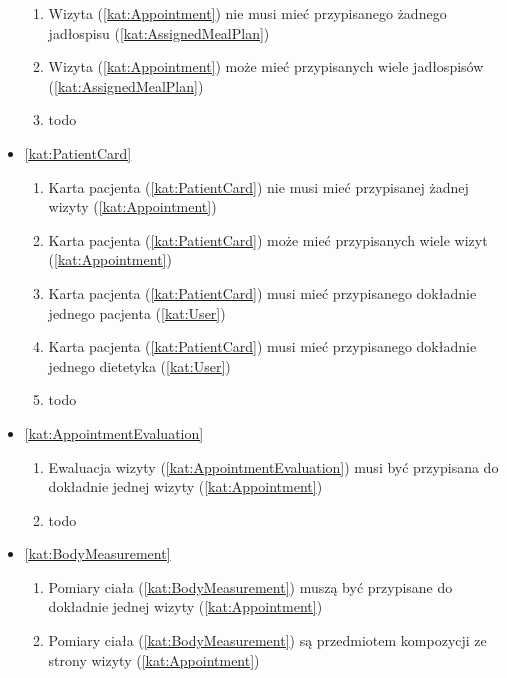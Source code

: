 \begin{itemize}[label={\textbf{Reguły dla}}, wide, labelwidth=!, labelindent=0pt]
\begin{enumerate}[label={\textbf{REG/\protect\threedigits{\arabic{enumi}}}}, wide, labelwidth=!, align=left, leftmargin=3cm, resume]
        \item Wizyta (\ref{kat:Appointment}) nie musi mieć przypisanego żadnego jadłospisu (\ref{kat:AssignedMealPlan})
        \item Wizyta (\ref{kat:Appointment}) może mieć przypisanych wiele jadłospisów (\ref{kat:AssignedMealPlan})
        \item todo
    \end{enumerate}
    \item\ref{kat:PatientCard}
    \begin{enumerate}[label={\textbf{REG/\protect\threedigits{\arabic{enumi}}}}, wide, labelwidth=!, align=left, leftmargin=3cm, resume]
        \item Karta pacjenta (\ref{kat:PatientCard}) nie musi mieć przypisanej żadnej wizyty (\ref{kat:Appointment})
        \item Karta pacjenta (\ref{kat:PatientCard}) może mieć przypisanych wiele wizyt (\ref{kat:Appointment})
        \item Karta pacjenta (\ref{kat:PatientCard}) musi mieć przypisanego dokładnie jednego pacjenta (\ref{kat:User})
        \item Karta pacjenta (\ref{kat:PatientCard}) musi mieć przypisanego dokładnie jednego dietetyka (\ref{kat:User})
        \item todo
    \end{enumerate}
    \item\ref{kat:AppointmentEvaluation}
    \begin{enumerate}[label={\textbf{REG/\protect\threedigits{\arabic{enumi}}}}, wide, labelwidth=!, align=left, leftmargin=3cm, resume]
        \item Ewaluacja wizyty (\ref{kat:AppointmentEvaluation}) musi być przypisana do dokładnie jednej wizyty (\ref{kat:Appointment})
        \item todo
    \end{enumerate}
    \item\ref{kat:BodyMeasurement}
    \begin{enumerate}[label={\textbf{REG/\protect\threedigits{\arabic{enumi}}}}, wide, labelwidth=!, align=left, leftmargin=3cm, resume]
        \item Pomiary ciała (\ref{kat:BodyMeasurement}) muszą być przypisane do dokładnie jednej wizyty (\ref{kat:Appointment})
        \item Pomiary ciała (\ref{kat:BodyMeasurement}) są przedmiotem kompozycji ze strony wizyty (\ref{kat:Appointment})

\end{enumerate}
\end{itemize}
